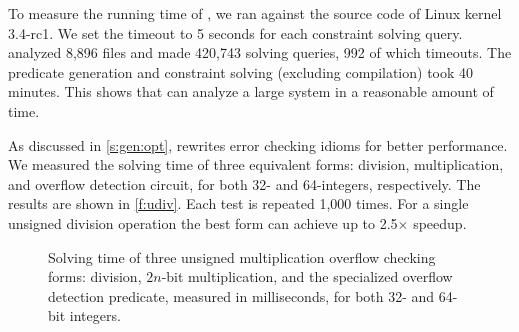 To measure the running time of \sys, we ran \sys against the source
code of Linux kernel 3.4-rc1.  We set the timeout
to 5 seconds for each constraint solving query.   \sys analyzed
8,896 files and made 420,743 solving queries, 992 of which timeouts.
The predicate generation and constraint solving (excluding compilation)
took 40 minutes.  This shows that \sys can analyze a large
system in a reasonable amount of time.

As discussed in \autoref{s:gen:opt}, \sys rewrites error checking
idioms for better performance.  We measured the solving time of three
equivalent forms: division, multiplication, and overflow detection
circuit, for both 32- and 64-integers, respectively.  The results
are shown in \autoref{f:udiv}.  Each test is repeated 1,000 times.
For a single unsigned division operation the best form can
achieve up to 2.5$\times$ speedup.

\begin{figure}
\centering

\caption{Solving time of three unsigned multiplication overflow
checking forms: division, $2n$-bit multiplication, and the specialized
overflow detection predicate, measured in milliseconds, for both
32- and 64-bit integers.}
\label{f:udiv}
\end{figure}

